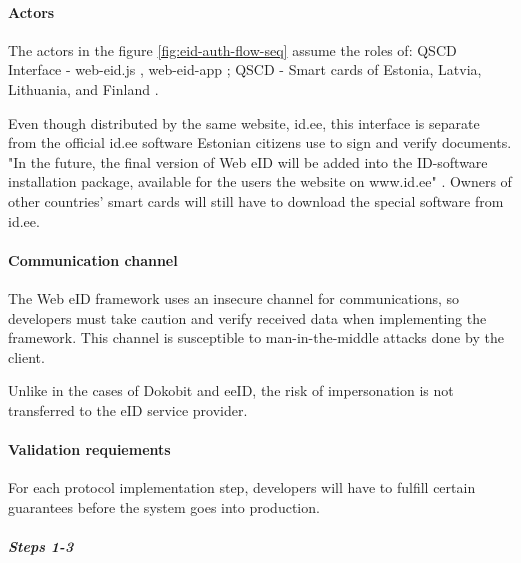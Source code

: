 \paragraph{Actors}

The actors in the figure \ref{fig:eid-auth-flow-seq} assume the roles of: QSCD Interface - web-eid.js \cite{ria-webeid-source-web-eid-js}, web-eid-app \cite{ria-webeid-source-web-eid-app}; QSCD - Smart cards of Estonia, Latvia, Lithuania, and Finland \cite{ria-webeid}.

Even though distributed by the same website, id.ee, this interface is separate from the official id.ee software Estonian citizens use to sign and verify documents. "In the future, the final version of Web eID will be added into the ID-software installation package, available for the users the website on www.id.ee" \cite{ria-webeid}. Owners of other countries' smart cards will still have to download the special software from id.ee.

\paragraph{Communication channel}

The Web eID framework uses an insecure channel for communications, so developers must take caution and verify received data when implementing the framework. This channel is susceptible to man-in-the-middle attacks done by the client.

Unlike in the cases of Dokobit and eeID, the risk of impersonation is not transferred to the eID service provider.

\paragraph{Validation requiements}

For each protocol implementation step, developers will have to fulfill certain guarantees before the system goes into production.

\subparagraph{Steps 1-3}

